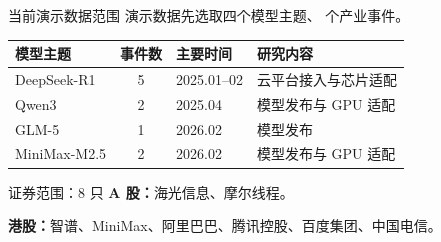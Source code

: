 \begin{frame}{当前演示数据范围}\relax
演示数据先选取四个模型主题、\EventCount{} 个产业事件。
\par\vspace{2mm}
{\fontsize{11.2}{14}\selectfont
\begin{tabularx}{\linewidth}{@{}p{3.2cm} c p{2.8cm} X@{}}
\toprule
模型主题 & 事件数 & 主要时间 & 研究内容\\
\midrule
DeepSeek-R1 & 5 & 2025.01--02 & 云平台接入与芯片适配\\
Qwen3 & 2 & 2025.04 & 模型发布与 GPU 适配\\
GLM-5 & 1 & 2026.02 & 模型发布\\
MiniMax-M2.5 & 2 & 2026.02 & 模型发布与 GPU 适配\\
\bottomrule
\end{tabularx}}
\par\vspace{2mm}
\begin{block}{证券范围：8 只}
\textbf{A 股：}海光信息、摩尔线程。\par
\textbf{港股：}智谱、MiniMax、阿里巴巴、腾讯控股、百度集团、中国电信。
\end{block}
\end{frame}
